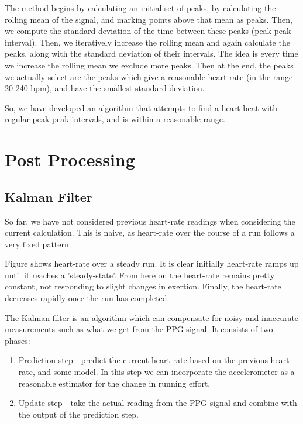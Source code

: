 \documentclass[12pt,a4paper,twoside,openright]{report}
\begin{document}
The method begins by calculating an initial set of peaks, by calculating the
rolling mean of the signal, and marking points above that mean as peaks. Then,
we compute the standard deviation of the time between these peaks (peak-peak
interval). Then, we iteratively increase the rolling mean and again calculate
the peaks, along with
the standard deviation of their intervals. The idea is every time we increase the rolling mean we 
exclude more peaks. Then at the end, the peaks we actually select are the peaks which give a reasonable
heart-rate (in the range 20-240 bpm), and have the smallest standard deviation.

So, we have developed an algorithm that attempts to find a heart-beat with
regular peak-peak intervals, and is within a reasonable range.



\section{Post Processing}

\subsection{Kalman Filter}

So far, we have not considered previous heart-rate readings when considering
the current calculation. This is naive, as heart-rate over the course of a run
follows a very fixed pattern. 

Figure    shows heart-rate over a steady run. It is clear initially heart-rate
ramps up until it reaches a 'steady-state'. From here on the heart-rate
remains pretty constant, not responding to slight changes in exertion.
Finally, the heart-rate decreases rapidly once the run has completed.

The Kalman filter is an algorithm which can compensate for noisy and
inaccurate measurements such as what we get from the PPG signal. It consists
of two phases:
\begin{enumerate}
	\item Prediction step - predict the current heart rate based on the
		previous heart rate, and some model. In this step we can
		incorporate the accelerometer as a reasonable estimator for
		the change in running effort.

	\item Update step - take the actual reading from the PPG signal and combine
		with the output of the prediction step.
\end{enumerate}
\end{document}
